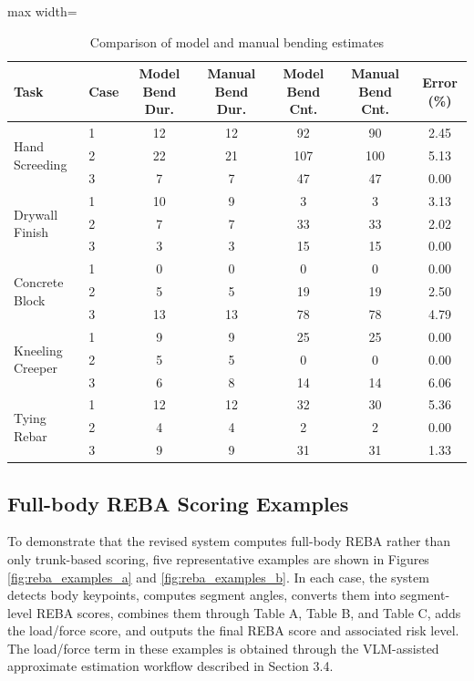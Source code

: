 \documentclass[11pt]{article}
\begin{document}

\begin{table}[H]
\centering
\scriptsize
\caption{Comparison of model and manual bending estimates}
\setlength{\tabcolsep}{4pt} %
\renewcommand{\arraystretch}{0.95} %
\begin{adjustbox}{max width=\textwidth}
\begin{tabular}{llccccc}
\toprule
\textbf{Task} & \textbf{Case} & \textbf{Model Bend Dur.} & \textbf{Manual Bend Dur.} & \textbf{Model Bend Cnt.} & \textbf{Manual Bend Cnt.} & \textbf{Error (\%)} \\
\midrule
\multirow{3}{*}{Hand Screeding} & 1 & 12 & 12 & 92 & 90 & 2.45 \\
 & 2 & 22 & 21 & 107 & 100 & 5.13 \\
 & 3 & 7 & 7 & 47 & 47 & 0.00 \\
\multirow{3}{*}{Drywall Finish} & 1 & 10 & 9 & 3 & 3 & 3.13 \\
 & 2 & 7 & 7 & 33 & 33 & 2.02 \\
 & 3 & 3 & 3 & 15 & 15 & 0.00 \\
\multirow{3}{*}{Concrete Block} & 1 & 0 & 0 & 0 & 0 & 0.00 \\
 & 2 & 5 & 5 & 19 & 19 & 2.50 \\
 & 3 & 13 & 13 & 78 & 78 & 4.79 \\
\multirow{3}{*}{Kneeling Creeper} & 1 & 9 & 9 & 25 & 25 & 0.00 \\
 & 2 & 5 & 5 & 0 & 0 & 0.00 \\
 & 3 & 6 & 8 & 14 & 14 & 6.06 \\
\multirow{3}{*}{Tying Rebar} & 1 & 12 & 12 & 32 & 30 & 5.36 \\
 & 2 & 4 & 4 & 2 & 2 & 0.00 \\
 & 3 & 9 & 9 & 31 & 31 & 1.33 \\
\bottomrule
\end{tabular}
\end{adjustbox}
\label{table1}
\end{table}

  \subsection{Full-body REBA Scoring Examples}

To demonstrate that the revised system computes full-body REBA rather than only trunk-based scoring, five representative examples are shown in Figures \ref{fig:reba_examples_a} and \ref{fig:reba_examples_b}. In each case, the system detects body keypoints, computes segment angles, converts them into segment-level REBA scores, combines them through Table A, Table B, and Table C, adds the load/force score, and outputs the final REBA score and associated risk level. The load/force term in these examples is obtained through the VLM-assisted approximate estimation workflow described in Section 3.4.
\end{document}
